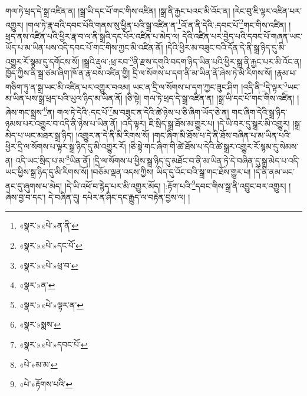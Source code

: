 གལ་ཏེ་ཕྲད་དེ་སྒྲ་འཛིན་ན། །སྒྲ་ཡི་དང་པོ་གང་གིས་འཛིན། །སྒྲ་ནི་རྐྱང་པའང་མི་འོང་ན། །རེང་བུ་ཇི་ལྟར་འཛིན་པར་འགྱུར། །གལ་ཏེ་རྣ་བའི་དབང་པོའི་གནས་སུ་ཕྱིན་པའི་སྒྲ་འཛིན་ན་\footnote{«སྣར་»«པེ་»ན་ནི་}འོ་ན་ནི་དེའི་:དབང་པོ་\footnote{«སྣར་»«པེ་»དང་པོ་}གང་གིས་འཛིན། །ཕྲད་ནས་འཛིན་པའི་ཕྱིར་རྣ་བ་ལ་ནི་སྒྲའི་དང་པོར་འཛིན་པ་མེད་ལ། དེའི་འཛིན་པར་བྱེད་པའི་དབང་པོ་གཞན་ཡང་ཡོད་པ་མ་ཡིན་པས་འདི་དབང་པོ་གང་གིས་ཀྱང་མི་འཛིན་ནོ། །དེའི་ཕྱིར་མ་བཟུང་བའི་དོན་དེ་ནི་སྒྲ་ཉིད་དུ་མི་འགྱུར་རོ་སྙམ་དུ་དགོངས་སོ། །སྒྲའི་རྡུལ་:ཕྲ་རབ་\footnote{«སྣར་»«པེ་»ཕྲ་བ་}ནི་རྫས་དགུའི་བདག་ཉིད་ཡིན་པའི་ཕྱིར་སྒྲ་ནི་རྐྱང་པར་མི་འོང་ན། ཁྱོད་ཀྱིས་ནི་སྒྲ་ཙམ་ཞིག་ཁོ་ན་རྣ་བས་འཛིན་གྱི། དྲི་ལ་སོགས་པ་དག་ནི་མ་ཡིན་ནོ་ཞེས་ཏེ་མི་རིགས་སོ། །རྣམ་པ་གཅིག་ཏུ་ན་སྒྲ་ཡང་མི་འཛིན་པར་འགྱུར་བའམ། ཡང་ན་དྲི་ལ་སོགས་པ་དག་ཀྱང་ཟུང་ཤིག །འདི་ནི་\footnote{«སྣར་»ན་}དེ་ལྟར་\footnote{«སྣར་»«པེ་»ལྟར་ན་}ཡང་མ་ཡིན་པས་སྒྲ་ཕྲད་པའི་ཡུལ་ཉིད་མ་ཡིན་ནོ། །ཅི་སྟེ། གལ་ཏེ་ཕྲད་དེ་སྒྲ་འཛིན་ན། །སྒྲ་ཡི་དང་པོ་གང་གིས་འཛིན། །ཞེས་གང་སྨྲས་\footnote{«སྣར་»སྨས་}ན། གལ་ཏེ་དེའི་:དང་པོ་\footnote{«སྣར་»«པེ་»དབང་པོ་}མ་བཟུང་ན་དེའི་ཚེ་ཉེས་པ་ཅི་ཞིག་ཡོད་ཅེ་ན། གང་ཞིག་དེའི་སྒྲ་ཉིད་ཉམས་པར་འགྱུར་བ་འདི་ནི་ཉེས་པ་ཡིན་ནོ། །འདི་ལྟར། ཇི་སྲིད་སྒྲ་ཐོས་མ་གྱུར་པ། །དེ་ཡི་བར་དུ་སྒྲར་མི་འགྱུར། །སྒྲ་མེད་པ་ཡང་མཐར་སྒྲ་ཉིད། །འགྱུར་ན་དེ་ནི་མི་རིགས་སོ། །གང་ཞིག་མི་ཐོས་པ་དེ་ནི་ཐོས་བཞིན་པ་མ་ཡིན་པའི་ཕྱིར་དྲི་ལ་སོགས་པ་ལྟར་སྒྲ་ཉིད་དུ་མི་འགྱུར་རོ། །ཅི་སྟེ་གང་ཞིག་གི་ཚེ་ཐོས་པ་དེའི་ཚེ་སྒྲར་འགྱུར་རོ་སྙམ་དུ་སེམས་ན། འདི་ཡང་སྲིད་པ་མ་\footnote{«པེ་»མ་མ་}ཡིན་ནོ། །དྲི་ལ་སོགས་པ་ཕྱིས་སྒྲ་ཉིད་དུ་མཐོང་བ་ནི་མ་ཡིན་ཏེ་དེ་བཞིན་དུ་སྒྲ་མེད་པ་འདི་ཡང་ཕྱིས་སྒྲ་ཉིད་དུ་མི་རིགས་སོ། །བཅོམ་ལྡན་འདས་ཀྱིས། ཡིད་དུ་འོང་བའི་སྒྲ་གང་ཐོས་གྱུར་པ། །དེ་ནི་ནམ་ཡང་ནང་དུ་ཞུགས་པ་མེད། །དེ་ཡི་འཕོ་བ་རྙེད་པར་མི་འགྱུར་མོད། །:རྟོག་པའི་\footnote{«པེ་»རྟོགས་པའི་}དབང་གིས་སྒྲ་ནི་འབྱུང་བར་འགྱུར། །ཞེས་བྱ་བ་དང་། དེ་བཞིན་དུ། དཔེར་ན་ཤིང་དང་རྒྱུད་ལ་བརྟེན་བྱས་ལ། །
